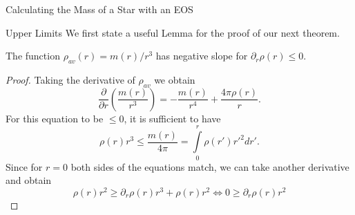 \begin{section}{Calculating the Mass of a Star with an EOS}
\begin{subsection}{Upper Limits}
We first state a useful Lemma for the proof of our next theorem.
\begin{lemma}
	The function $\rho_{av}(r)=m(r)/r^3$ has negative slope for $\partial_r\rho(r)\leq0$.
\end{lemma}
\begin{proof}
	Taking the derivative of $\rho_{av}$ we obtain 
	\begin{equation}
		\frac{\partial}{\partial r}\left(\frac{m(r)}{r^3}\right) = -\frac{m(r)}{r^4} + \frac{4\pi\rho(r)}{r}.
	\end{equation}
	For this equation to be $\leq0$, it is sufficient to have
	\begin{equation}
		\rho(r)r^3\leq\frac{m(r)}{4\pi}=\int\limits_0^r\rho(r')r'^2dr'.
	\end{equation}
	Since for $r=0$ both sides of the equations match, we can take another derivative and obtain 
	\begin{equation}
		\rho(r)r^2\geq\partial_r\rho(r)r^3+\rho(r)r^2 \Leftrightarrow 0 \geq \partial_r\rho(r)r^2

\end{equation}
\end{proof}
\end{subsection}
\end{section}
